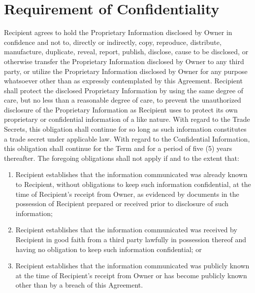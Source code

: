 \documentclass[letterpaper,10pt,english]{sphinxmanual}
\begin{document}
\section{Requirement of Confidentiality}
\label{\detokenize{nondisclosure:requirement-of-confidentiality}}
Recipient agrees to hold the Proprietary Information disclosed by Owner in confidence and not to, directly or indirectly, copy, reproduce, distribute, manufacture, duplicate, reveal, report, publish, disclose, cause to be disclosed, or otherwise transfer the Proprietary Information disclosed by Owner to any third party, or utilize the Proprietary Information disclosed by Owner for any purpose whatsoever other than as expressly contemplated by this Agreement. Recipient shall protect the disclosed Proprietary Information by using the same degree of care, but no less than a reasonable degree of care, to prevent the unauthorized disclosure of the Proprietary Information as Recipient uses to protect its own proprietary or confidential information of a like nature.  With regard to the Trade Secrets, this obligation shall continue for so long as such information constitutes a trade secret under applicable law. With regard to the Confidential Information, this obligation shall continue for the Term and for a period of five (5) years thereafter. The foregoing obligations shall not apply if and to the extent that:
\begin{enumerate}
\item {} 
Recipient establishes that the information communicated was already known to Recipient, without obligations to keep such information confidential, at the time of Recipient’s receipt from Owner, as evidenced by documents in the possession of Recipient prepared or received prior to disclosure of such information;

\item {} 
Recipient establishes that the information communicated was received by Recipient in good faith from a third party lawfully in possession thereof and having no obligation to keep such information confidential; or

\item {} 
Recipient establishes that the information communicated was publicly known at the time of Recipient’s receipt from Owner or has become publicly known other than by a breach of this Agreement.

\end{enumerate}
\end{document}
